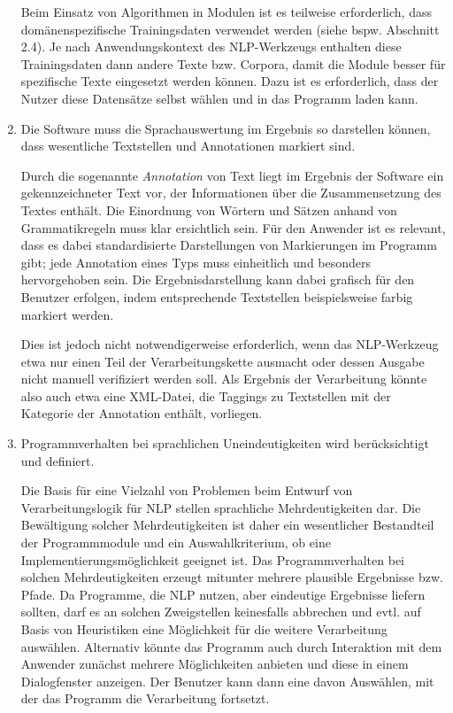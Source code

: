 \documentclass[12pt]{report}
\begin{document}
\begin{enumerate}
Beim Einsatz von Algorithmen in Modulen ist es teilweise erforderlich, dass domänenspezifische Trainingsdaten verwendet werden (siehe bspw. Abschnitt 2.4). Je nach Anwendungskontext des NLP-Werkzeugs enthalten diese Trainingsdaten dann andere Texte bzw. Corpora, damit die Module besser für spezifische Texte eingesetzt werden können. Dazu ist es erforderlich, dass der Nutzer diese Datensätze selbst wählen und in das Programm laden kann.

\item Die Software muss die Sprachauswertung im Ergebnis so darstellen können, dass wesentliche Textstellen und Annotationen markiert sind. 

Durch die sogenannte \textit{Annotation} von Text liegt im Ergebnis der Software ein gekennzeichneter Text vor, der Informationen über die Zusammensetzung des Textes enthält. Die Einordnung von Wörtern und Sätzen anhand von Grammatikregeln muss klar ersichtlich sein. Für den Anwender ist es relevant, dass es dabei standardisierte Darstellungen von Markierungen im Programm gibt; jede Annotation eines Typs muss einheitlich und besonders hervorgehoben sein. Die Ergebnisdarstellung kann dabei grafisch für den Benutzer erfolgen, indem entsprechende Textstellen beispielsweise farbig markiert werden.

Dies ist jedoch nicht notwendigerweise erforderlich, wenn das NLP-Werkzeug etwa nur einen Teil der Verarbeitungskette ausmacht oder dessen Ausgabe nicht manuell verifiziert werden soll. Als Ergebnis der Verarbeitung könnte also auch etwa eine XML-Datei, die Taggings zu Textstellen mit der Kategorie der Annotation enthält, vorliegen.

\item Programmverhalten bei sprachlichen Uneindeutigkeiten wird berücksichtigt und definiert.

Die Basis für eine Vielzahl von Problemen beim Entwurf von Verarbeitungslogik für NLP stellen sprachliche Mehrdeutigkeiten dar. Die Bewältigung solcher Mehrdeutigkeiten ist daher ein wesentlicher Bestandteil der Programmmodule und ein Auswahlkriterium, ob eine Implementierungsmöglichkeit geeignet ist. Das Programmverhalten bei solchen Mehrdeutigkeiten erzeugt mitunter mehrere plausible Ergebnisse bzw. Pfade. Da Programme, die NLP nutzen, aber eindeutige Ergebnisse liefern sollten, darf es an solchen Zweigstellen keinesfalls abbrechen und evtl. auf Basis von Heuristiken eine Möglichkeit für die weitere Verarbeitung auswählen. Alternativ könnte das Programm auch durch Interaktion mit dem Anwender zunächst mehrere Möglichkeiten anbieten und diese in einem Dialogfenster anzeigen. Der Benutzer kann dann eine davon Auswählen, mit der das Programm die Verarbeitung fortsetzt.


\end{enumerate}
\end{document}
